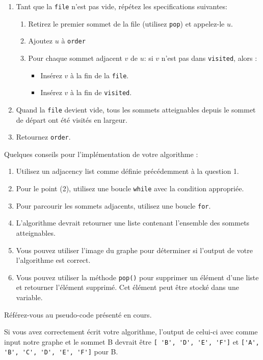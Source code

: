 \begin{Exercice}[20 minutes]
\begin{enumerate}
\item Tant que la \texttt{file} n'est pas vide, répétez les specifications suivantes\!:
\begin{enumerate}
    \item Retirez le premier sommet de la file (utilisez \texttt{pop}) et appelez-le $u$. 
    \item Ajoutez $u$ à \texttt{order}
    \item Pour chaque sommet adjacent $v$ de $u$\!: si $v$ n'est pas dans \texttt{visited}, alors :
        \begin{itemize}
            \item Insérez $v$ à la fin de la \texttt{file}.
            \item Insérez $v$ à la fin de \texttt{visited}.
        \end{itemize}
\end{enumerate}

\item Quand la \texttt{file} devient vide, tous les sommets atteignables depuis le sommet de départ ont été visités en largeur.
\item Retournez \texttt{order}.
\end{enumerate}

    \begin{conseil}
        Quelques conseils pour l'implémentation de votre algorithme :
        \begin{enumerate}
            \item Utilisez un adjacency list comme définie précédemment à la question 1.
            \item Pour le point (2), utilisez une boucle \lstinline{while} avec la condition appropriée.
            \item Pour parcourir les sommets adjacents, utilisez une boucle \lstinline{for}.
            \item L'algorithme devrait retourner une liste contenant l'ensemble des sommets atteignables.
            \item Vous pouvez utiliser l'image du graphe pour déterminer si l'output de votre l'algorithme est correct.
            \item Vous pouvez utiliser la méthode \lstinline{pop()} pour supprimer un élément d'une liste et retourner l'élément supprimé. Cet élément peut être stocké dans une variable.
        \end{enumerate}
        Référez-vous au pseudo-code présenté en cours.
    \end{conseil}
    \begin{solution}
        
        Si vous avez correctement écrit votre algorithme, l'output de celui-ci avec comme input notre graphe et le sommet B devrait être \lstinline|[ 'B', 'D', 'E', 'F']| et \lstinline|['A', 'B', 'C', 'D', 'E', 'F']| pour B.
    \end{solution}
\end{Exercice}


